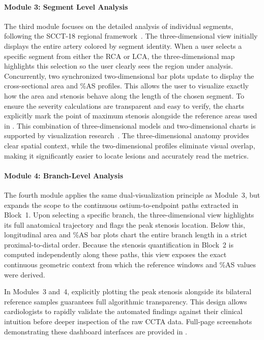 \paragraph{Module 3: Segment Level Analysis}\mbox{}\par\vspace{0.5em}
The third module focuses on the detailed analysis of individual segments, following the SCCT-18 regional framework~\cite{leipsic2014}. The three-dimensional view initially displays the entire artery colored by segment identity. When a user selects a specific segment from either the RCA or LCA, the three-dimensional map highlights this selection so the user clearly sees the region under analysis. Concurrently, two synchronized two-dimensional bar plots update to display the cross-sectional area and \%AS profiles. This allows the user to visualize exactly how the area and stenosis behave along the length of the chosen segment. To ensure the severity calculations are transparent and easy to verify, the charts explicitly mark the point of maximum stenosis alongside the reference areas used in . This combination of three-dimensional models and two-dimensional charts is supported by visualization research~\cite{borkin2011}. The three-dimensional anatomy provides clear spatial context, while the two-dimensional profiles eliminate visual overlap, making it significantly easier to locate lesions and accurately read the metrics.

\paragraph{Module 4: Branch-Level Analysis}\mbox{}\par\vspace{0.5em}
The fourth module applies the same dual-visualization principle as Module~3, but expands the scope to the continuous ostium-to-endpoint paths extracted in Block~1. Upon selecting a specific branch, the three-dimensional view highlights its full anatomical trajectory and flags the peak stenosis location. Below this, longitudinal area and \%AS bar plots chart the entire branch length in a strict proximal-to-distal order. Because the stenosis quantification in Block~2 is computed independently along these paths, this view exposes the exact continuous geometric context from which the reference windows and \%AS values were derived.

In Modules~3 and~4, explicitly plotting the peak stenosis alongside its bilateral reference samples guarantees full algorithmic transparency. This design allows cardiologists to rapidly validate the automated findings against their clinical intuition before deeper inspection of the raw CCTA data. Full-page screenshots demonstrating these dashboard interfaces are provided in .

